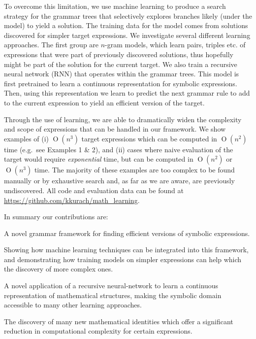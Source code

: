 \documentclass{article} %
\newcommand{\BigO}[1]{\ensuremath{\operatorname{O}\left(#1\right)}}
\begin{document}
To overcome this limitation, we use machine learning to produce
a search strategy for the grammar trees that selectively explores 
branches likely (under the model) to yield a solution. The training data for
the model comes from solutions discovered for simpler target
expressions. We investigate several different learning approaches. The
first group are $n$-gram models, which learn pairs, triples etc. of
expressions that were part of previously discovered solutions, thus
hopefully might be part of the solution for the current target. We
also train a recursive neural network (RNN) that operates
within the grammar trees. This model is first pretrained to learn a continuous representation for symbolic
expressions. Then, using this representation we learn to predict the
next grammar rule to add to the current expression to yield an
efficient version of the target. 

Through the use of learning, we are able to dramatically widen the
complexity and scope of expressions that can be handled in our
framework. We show examples of (i) $\BigO{n^3}$ target expressions
which can be computed in $\BigO{n^2}$ time (e.g.~see Examples 1 \& 2), and
(ii) cases where naive evaluation of the target would require {\em
  exponential} time, but can be computed in $\BigO{n^2}$ or
$\BigO{n^3}$ time. The majority of these examples are too complex to
be found manually or by exhaustive search and, as far as we are aware,
are previously undiscovered. All code and evaluation data can be found at \url{https://github.com/kkurach/math_learning}.

In summary our contributions are:
\begin{compactitem}
\item A novel grammar framework for finding
  efficient versions of symbolic expressions.
\item Showing how machine learning techniques can be integrated into
  this framework, and demonstrating how training models on
  simpler expressions can help which the discovery of more complex ones.
\item A novel application of a recursive neural-network to learn a continuous representation of 
  mathematical structures, making the symbolic domain accessible to
  many other learning approaches.
\item The discovery of many new mathematical identities which offer a significant reduction
  in computational complexity for certain expressions.
\end{compactitem}
\end{document}
